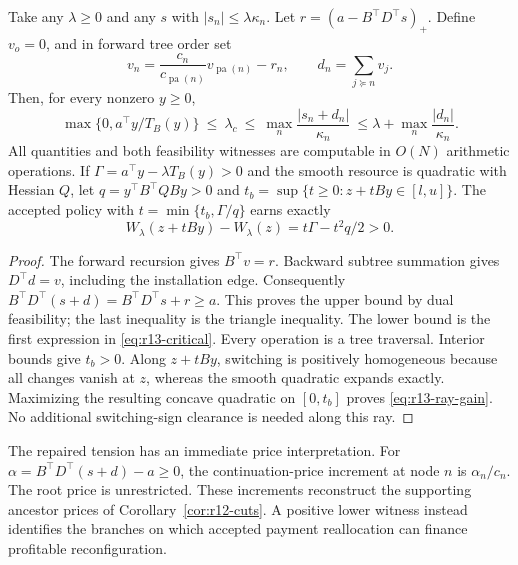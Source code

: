 \begin{theorem}\label{thm:r13-bracket}
Take any $\lambda\geq0$ and any $s$ with $|s_n|\leq\lambda\kappa_n$. Let $r=(a-B^\top D^\top s)_+$. Define $v_o=0$, and in forward tree order set
\[
 v_n=\frac{c_n}{c_{\operatorname{pa}(n)}}v_{\operatorname{pa}(n)}-r_n,
 \qquad d_n=\sum_{j\succeq n}v_j.
\]
Then, for every nonzero $y\geq0$,
\begin{equation}\label{eq:r13-bracket}
 \max\{0,a^\top y/T_B(y)\}\ \leq\ \lambda_c\ \leq\
 \max_n\frac{|s_n+d_n|}{\kappa_n}
 \ \leq\lambda+\max_n\frac{|d_n|}{\kappa_n}.
\end{equation}
All quantities and both feasibility witnesses are computable in $O(N)$ arithmetic operations. If $\Gamma=a^\top y-\lambda T_B(y)>0$ and the smooth resource is quadratic with Hessian $Q$, let $q=y^\top B^\top QBy>0$ and
$t_b=\sup\{t\geq0:z+tBy\in[l,u]\}$. The accepted policy with
$t=\min\{t_b,\Gamma/q\}$ earns exactly
\begin{equation}\label{eq:r13-ray-gain}
 W_\lambda(z+tBy)-W_\lambda(z)=t\Gamma-t^2q/2>0.
\end{equation}
\end{theorem}
\begin{proof}
The forward recursion gives $B^\top v=r$. Backward subtree summation gives $D^\top d=v$, including the installation edge. Consequently
$B^\top D^\top(s+d)=B^\top D^\top s+r\geq a$.
This proves the upper bound by dual feasibility; the last inequality is the triangle inequality. The lower bound is the first expression in \eqref{eq:r13-critical}. Every operation is a tree traversal. Interior bounds give $t_b>0$. Along $z+tBy$, switching is positively homogeneous because all changes vanish at $z$, whereas the smooth quadratic expands exactly. Maximizing the resulting concave quadratic on $[0,t_b]$ proves \eqref{eq:r13-ray-gain}. No additional switching-sign clearance is needed along this ray.
\end{proof}
The repaired tension has an immediate price interpretation. For $\alpha=B^\top D^\top(s+d)-a\geq0$, the continuation-price increment at node $n$ is $\alpha_n/c_n$. The root price is unrestricted. These increments reconstruct the supporting ancestor prices of Corollary~\ref{cor:r12-cuts}. A positive lower witness instead identifies the branches on which accepted payment reallocation can finance profitable reconfiguration.

